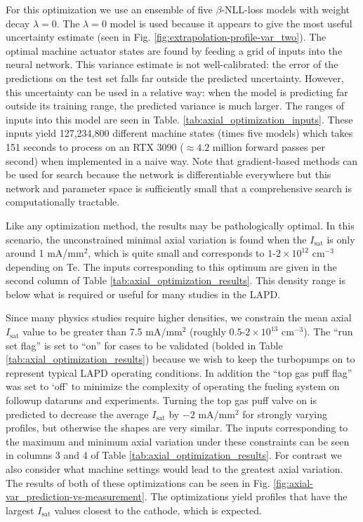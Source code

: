 For this optimization we use an ensemble of five $\beta$-NLL-loss models with weight decay $\lambda=0$. The $\lambda=0$ model is used because it appears to give the most useful uncertainty estimate (seen in Fig. \ref{fig:extrapolation-profile-var_two}). The optimal machine actuator states are found by feeding a grid of inputs into the neural network. This variance estimate is not well-calibrated: the error of the predictions on the test set falls far outside the predicted uncertainty. However, this uncertainty can be used in a relative way: when the model is predicting far outside its training range, the predicted variance is much larger. The ranges of inputs into this model are seen in Table. \ref{tab:axial_optimization_inputs}. These inputs yield 127,234,800 different machine states (times five models) which takes 151 seconds to process on an RTX 3090 ($\approx 4.2$ million forward passes per second) when implemented in a naive way. Note that gradient-based methods can be used for search because the network is differentiable everywhere but this network and parameter space is sufficiently small that a comprehensive search is computationally tractable.

Like any optimization method, the results may be pathologically optimal. In this scenario, the unconstrained minimal axial variation is found when the $I_\text{sat}$ is only around 1 mA/mm$^2$, which is quite small and corresponds to $1\text{-}2\times 10^{12}$ cm$^{-3}$ depending on Te. The inputs corresponding to this optimum are given in the second column of Table \ref{tab:axial_optimization_results}. This density range is below what is required or useful for many studies in the LAPD. 

Since many physics studies require higher densities, we constrain the mean axial $I_\text{sat}$ value to be greater than 7.5 mA/mm$^{2}$ (roughly $0.5\text{-}2 \times 10^{13} \text{ cm}^{-3}$). The ``run set flag'' is set to ``on'' for cases to be validated (bolded in Table \ref{tab:axial_optimization_results}) because we wish to keep the turbopumps on to represent typical LAPD operating conditions. In addition the ``top gas puff flag'' was set to `off' to minimize the complexity of operating the fueling system on followup dataruns and experiments. Turning the top gas puff valve on is predicted to decrease the average $I_\text{sat}$ by $-2$ mA/mm$^2$ for strongly varying profiles, but otherwise the shapes are very similar.
The inputs corresponding to the maximum and minimum axial variation under these constraints can be seen in columns 3 and 4 of Table \ref{tab:axial_optimization_results}. For contrast we also consider what machine settings would lead to the greatest axial variation. The results of both of these optimizations can be seen in Fig. \ref{fig:axial-var_prediction-vs-measurement}. The optimizations yield profiles that have the largest $I_\text{sat}$ values closest to the cathode, which is expected.

